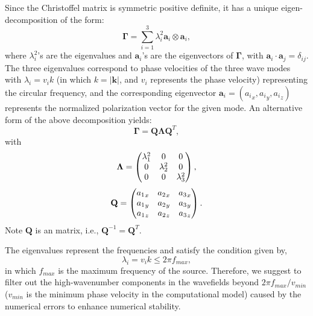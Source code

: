 Since the Christoffel matrix is symmetric positive definite, it has a unique
eigen-decomposition of the form:
\begin{equation}
\label{eq:decomp1}
\mathbf{\Gamma} = \sum_{i=1}^{3}{\lambda^2_i\mathbf{a}_i\otimes{\mathbf{a}_i}},
\end{equation}
where $\lambda^2_i$'s are the eigenvalues and $\mathbf{a}_i$'s are the eigenvectors
of $\mathbf{\Gamma}$, with $\mathbf{a}_i\cdot{\mathbf{a}_j}=\delta_{ij}$.
The three eigenvalues correspond to phase velocities of the three wave modes with
$\lambda_i = v_{i}k$ (in which $k=|\mathbf{k}|$, and $v_i$ represents the phase velocity) representing the circular frequency,
and the corresponding eigenvector $\mathbf{a}_i = ({a_i}_x, {a_i}_y,
{a_i}_z)$ represents the normalized polarization vector for the given mode.
An alternative form of the above decomposition yields:
\begin{equation}
\label{eq:decomp2}
\mathbf{\Gamma} = \mathbf{Q}\mathbf{\Lambda}{\mathbf{Q}^{T}},
\end{equation}
with
\begin{equation}
\label{eq:lambda}
\mathbf{\Lambda}=
\begin{pmatrix}{\lambda^2_1} & 0 &0 \cr 
	0 & {\lambda^2_2} & 0\cr
	0 & 0 & {\lambda^2_3}\end{pmatrix},
\end{equation}
\begin{equation}
\label{eq:qq}
\mathbf{Q}=
\begin{pmatrix}{a_1}_x & {a_2}_x &{a_3}_x \cr 
	{a_1}_y & {a_2}_y &{a_3}_y \cr
	{a_1}_z & {a_2}_z &{a_3}_z \end{pmatrix}.
\end{equation}
Note $\mathbf{Q}$ is an  matrix, i.e.,
$\mathbf{Q}^{-1}=\mathbf{Q}^{T}$.

The eigenvalues represent the frequencies and satisfy the condition given by,
\begin{equation}
\label{eq:freqband}
\lambda_i = v_{i}k \le 2\pi{f_{max}},
\end{equation}
in which $f_{max}$ is the maximum frequency of the source.
Therefore, we suggest to filter out the high-wavenumber components in the wavefields
beyond $2\pi{f_{max}}/v_{min}$ ($v_{min}$ is the minimum phase velocity in the computational model)
caused by the numerical errors to enhance numerical stability.

